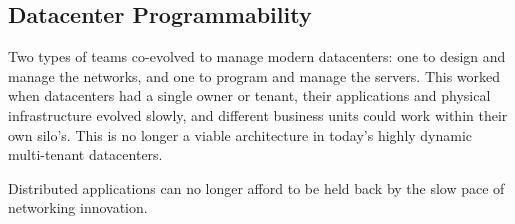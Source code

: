 \documentclass[../HFT-main.tex]{subfiles}
\begin{document}
\subsection*{Datacenter Programmability}
\vspace{-4pt}
Two types of teams co-evolved to manage modern datacenters: one to design and manage the networks, and one to program and manage the servers. This worked %
when datacenters had a single owner or tenant, their applications and physical infrastructure evolved slowly, and different business units could work within their own silo's. %
This is no longer a viable architecture in today's highly dynamic multi-tenant datacenters.
\vspace{-3pt}
\begin{framed}
\noindent Distributed applications can no longer afford to be held back by the slow pace of networking innovation.
\end{framed}


%
%
%
\end{document}
